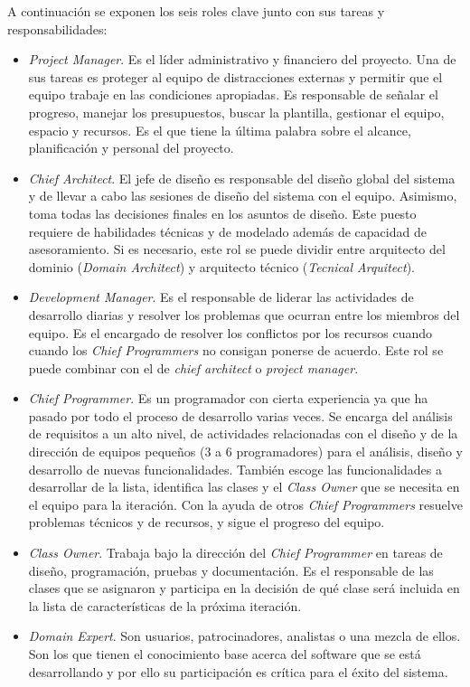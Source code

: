 \documentclass[11pt]{article}
\begin{document}
A continuación se exponen los seis roles clave junto con sus tareas y responsabilidades:
\begin{itemize}
\item \textit{Project Manager}. Es el líder administrativo y financiero del proyecto. Una de sus tareas es proteger al equipo de distracciones externas y permitir que el equipo trabaje en las condiciones apropiadas. Es responsable de señalar el progreso, manejar los presupuestos, buscar la plantilla, gestionar el equipo, espacio y recursos. Es el que tiene la última palabra sobre el alcance, planificación y personal del proyecto.
\item \textit{Chief Architect}. El jefe de diseño es responsable del diseño global del sistema y de llevar a cabo las sesiones de diseño del sistema con el equipo. Asimismo, toma todas las decisiones finales en los asuntos de diseño. Este puesto requiere de habilidades técnicas y de modelado además de capacidad de asesoramiento. Si es necesario, este rol se puede dividir entre arquitecto del dominio (\textit{Domain Architect}) y arquitecto técnico (\textit{Tecnical Arquitect}).
\item \textit{Development Manager}. Es el responsable de liderar las actividades de desarrollo diarias y resolver los problemas que ocurran entre los miembros del equipo. Es el encargado de resolver los conflictos por los recursos cuando cuando los \textit{Chief Programmers} no consigan ponerse de acuerdo. Este rol se puede combinar con el de \textit{chief architect} o \textit{project manager}.
\item \textit{Chief Programmer}. Es un programador con cierta experiencia ya que ha pasado por todo el proceso de desarrollo varias veces. Se encarga del análisis de requisitos a un alto nivel, de actividades relacionadas con el diseño y de la dirección de equipos pequeños (3 a 6 programadores) para el análisis, diseño y desarrollo de nuevas funcionalidades. También escoge las funcionalidades a desarrollar de la lista, identifica las clases y el \textit{Class Owner} que se necesita en el equipo para la
iteración. Con la ayuda de otros \textit{Chief Programmers} resuelve problemas técnicos y de recursos, y sigue el progreso
del equipo.
\item \textit{Class Owner}. Trabaja bajo la dirección del \textit{Chief Programmer} en tareas de diseño, programación, pruebas y documentación. Es el responsable de las clases que se asignaron y participa en la decisión de qué clase será incluida en la lista de características de la próxima iteración.
\item \textit{Domain Expert}. Son usuarios, patrocinadores, analistas o una mezcla de ellos. Son los que tienen el conocimiento base acerca del software que se está desarrollando y por ello su participación es crítica para el éxito del sistema.
\end{itemize}
\end{document}
